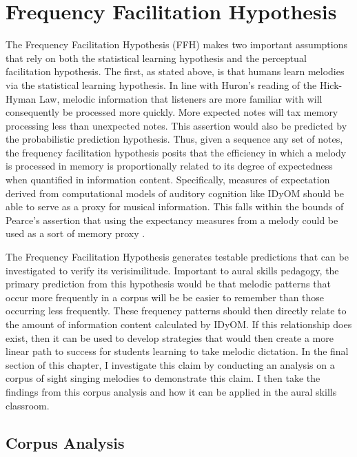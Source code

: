 \documentclass[12pt,]{book}
\begin{document}
\hypertarget{frequency-facilitation-hypothesis}{%
\section{Frequency Facilitation Hypothesis}\label{frequency-facilitation-hypothesis}}

The Frequency Facilitation Hypothesis (FFH) makes two important assumptions that rely on both the statistical learning hypothesis and the perceptual facilitation hypothesis.
The first, as stated above, is that humans learn melodies via the statistical learning hypothesis.
In line with Huron's reading of the Hick-Hyman Law, melodic information that listeners are more familiar with will consequently be processed more quickly.
More expected notes will tax memory processing less than unexpected notes.
This assertion would also be predicted by the probabilistic prediction hypothesis.
Thus, given a sequence any set of notes, the frequency facilitation hypothesis posits that the efficiency in which a melody is processed in memory is proportionally related to its degree of expectedness when quantified in information content.
Specifically, measures of expectation derived from computational models of auditory cognition like IDyOM should be able to serve as a proxy for musical information.
This falls within the bounds of Pearce's assertion that using the expectancy measures from a melody could be used as a sort of memory proxy \citep{pearceStatisticalLearningProbabilistic2018a}.

The Frequency Facilitation Hypothesis generates testable predictions that can be investigated to verify its verisimilitude.
Important to aural skills pedagogy, the primary prediction from this hypothesis would be that melodic patterns that occur more frequently in a corpus will be be easier to remember than those occurring less frequently.
These frequency patterns should then directly relate to the amount of information content calculated by IDyOM.
If this relationship does exist, then it can be used to develop strategies that would then create a more linear path to success for students learning to take melodic dictation.
In the final section of this chapter, I investigate this claim by conducting an analysis on a corpus of sight singing melodies to demonstrate this claim.
I then take the findings from this corpus analysis and how it can be applied in the aural skills classroom.

\hypertarget{corpus-analysis}{%
\subsection{Corpus Analysis}\label{corpus-analysis}}
\end{document}
